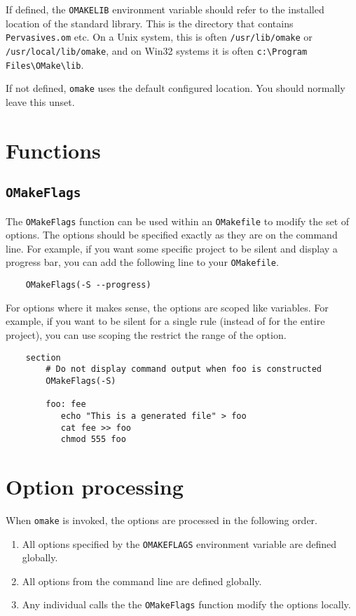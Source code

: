 If defined, the \verb+OMAKELIB+ environment variable should refer to the installed location of the
\OMake{} standard library.  This is the directory that contains \verb+Pervasives.om+ etc.  On a Unix
system, this is often \verb+/usr/lib/omake+ or \verb+/usr/local/lib/omake+, and on Win32 systems it
is often \verb+c:\Program Files\OMake\lib+.

If not defined, \verb+omake+ uses the default configured location.  You should normally leave this
unset.

\section{Functions}

\subsection{\texttt{OMakeFlags}}

The \verb+OMakeFlags+ function can be used within an \verb+OMakefile+ to modify
the set of options.  The options should be specified exactly as they are on the command line.  For
example, if you want some specific project to be silent and display a progress bar, you can add the
following line to your \verb+OMakefile+.

\begin{verbatim}
    OMakeFlags(-S --progress)
\end{verbatim}

For options where it makes sense, the options are scoped like variables.  For example, if you want
\OMake{} to be silent for a single rule (instead of for the entire project), you can use scoping the
restrict the range of the option.

\begin{verbatim}
    section
        # Do not display command output when foo is constructed
        OMakeFlags(-S)

        foo: fee
           echo "This is a generated file" > foo
           cat fee >> foo
           chmod 555 foo
\end{verbatim}

\section{Option processing}

When \verb+omake+ is invoked, the options are processed in the following order.

\begin{enumerate}
\item All options specified by the \verb+OMAKEFLAGS+ environment variable are defined globally.
\item All options from the command line are defined globally.
\item Any individual calls the the \verb+OMakeFlags+ function modify the options locally.
\end{enumerate}

